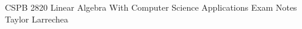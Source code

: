 \documentclass{Classes/solutionclass}
\begin{document}
\batchmode
\pretitle
{CSPB 2820}
{\normalsize{Linear Algebra With Computer Science Applications}}
{\normalsize{Exam Notes}}
{Taylor Larrechea}
\makeatletter
    \startcontents[sections]
    \thispagestyle{fancy}
\makeatother
\vspace{-2em}

\end{document}
